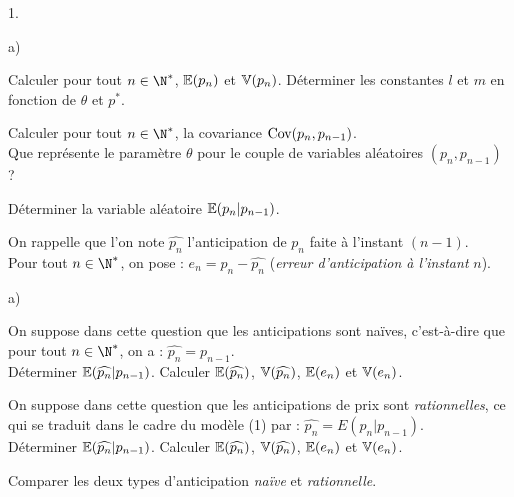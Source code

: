 \documentclass[11pt]{article}%
\begin{document}
\begin{noliste}{1.}
 \setlength{\itemsep}{4mm}

\item \begin{noliste}{a)}
 \setlength{\itemsep}{2mm}

\item Calculer pour tout $n \in \N^{\ast}$, $\mathbb{E}(p_{n})$ et $\mathbb{V}(p_{n})$.
Déterminer les constantes $l$ et $m$ en fonction de $\theta$ et
$p^{\ast}$. \\

\item Calculer pour tout $n \in \N^{\ast}$, la covariance ${\rm{Cov}} (p_{n},
p_{n-1} )$. \\
Que représente le paramètre $\theta$ pour le couple de variables
aléatoires $(p_{n}, p_{n-1})$ ? \\

\end{noliste}

\item Déterminer la variable aléatoire $\mathbb{E}(p_{n} | p_{n-1})$. \\

\item On rappelle que l'on note $\widehat{p_{n}}$ l'anticipation de
$p_{n}$ faite à l'instant $(n-1)$. \\
Pour tout $n \in \N^{\ast}$, on pose : $e_{n} = p_{n} -
\widehat{p_{n}}$ (\textit{erreur d'anticipation à l'instant} $n$).

\begin{noliste}{a)}
 \setlength{\itemsep}{2mm}

\item On suppose dans cette question que les anticipations sont naïves,
c'est-à-dire que pour tout $n \in \N^{\ast}$, on a : $\widehat{p_{n}} =
p_{n-1}$. \\
Déterminer $\mathbb{E}(\widehat{p_{n}} | p_{n-1})$. Calculer
$\mathbb{E}(\widehat{p_{n}})$, $\mathbb{V}(\widehat{p_{n}})$, $\mathbb{E}(e_{n})$ et
$\mathbb{V}(e_{n})$. \\

\item On suppose dans cette question que les anticipations de prix sont
\textit{rationnelles}, ce qui se traduit dans le cadre du modèle (1)
par : $\widehat{p_{n}} = E(p_{n} | p_{n-1})$. \\
Déterminer $\mathbb{E}(\widehat{p_{n}} | p_{n-1})$. Calculer
$\mathbb{E}(\widehat{p_{n}})$, $\mathbb{V}(\widehat{p_{n}})$, $\mathbb{E}(e_{n})$ et
$\mathbb{V}(e_{n})$. \\

\item Comparer les deux types d'anticipation \textit{naïve} et
\textit{rationnelle}.

\end{noliste}

\end{noliste}
\end{document}
